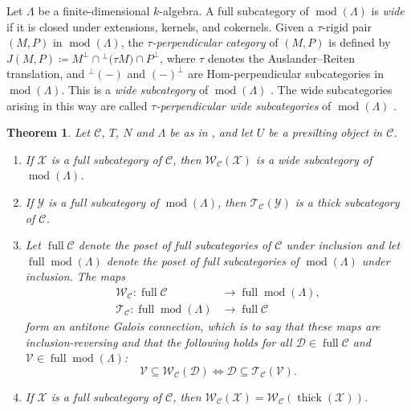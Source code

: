 \documentclass[10pt,twoside, a4paper,reqno]{amsart}
\DeclareMathOperator{\mods}{mod}
\DeclareMathOperator{\thick}{thick}
\DeclareMathOperator{\fullsubc}{full}
\newcommand{\calC}{\mathcal{C}}
\newcommand{\calT}{\mathcal{T}}
\newcommand{\calW}{\mathcal{W}}
\newtheorem{theorem}{Theorem}[section]
\theoremstyle{definition}
\begin{document}
Let $\Lambda$ be a finite-dimensional $k$-algebra. A full subcategory of $\mods(\Lambda)$ is \textit{wide} if it is closed under extensions, kernels, and cokernels.
Given a $\tau$-rigid pair $(M,P)$ in $\mods(\Lambda)$, the \textit{$\tau$-perpendicular category} of $(M,P)$ is defined by $J(M,P)\coloneqq M^{\perp} \cap {^{\perp}(\tau M})\cap P^{\perp}$, where $\tau$ denotes the Auslander--Reiten translation, and ${^{\perp}(-)}$ and ${(-)^{\perp}}$ are Hom-perpendicular subcategories in $\mods(\Lambda)$. This is a \textit{wide subcategory} of $\mods(\Lambda)$ \cite[{Thm.} 4.12(a)]{DIRRT17}. {The} wide subcategories arising in this way are called \textit{$\tau$-perpendicular wide subcategories} of $\mods(\Lambda)$ \cite[{Def.} 3.2]{BH21}.

\begin{theorem}\label{prop:Monica}
    Let $\calC$, $T$, $N$ and $\Lambda$ be as in , and let $U$ be a presilting object in $\calC$.
    \begin{enumerate}
        \item\label{prop:Monica_W} If $\mathcal{X}$ is a full subcategory of $\calC$, then $\calW_{\calC}(\mathcal{X})$ is a wide subcategory of $\mods(\Lambda)$.
        \item\label{prop:Monica_T} If $\mathcal{Y}$ is a full subcategory of $\mods(\Lambda)$, then $\calT_{\calC}(\mathcal{Y})$ is a thick subcategory of $\calC$.
        \item\label{prop:Monica_Galois} Let $\fullsubc{\calC}$ denote the poset of full subcategories of $\calC$ {under inclusion} and {let} $\fullsubc \mods(\Lambda)$ denote the poset of full subcategories of $\mods(\Lambda)$ {under inclusion}. The maps 
    \begin{align*}
        \calW_{\calC}: \fullsubc {\calC} &\to \fullsubc \mods(\Lambda), \\
        \calT_{\calC}: \fullsubc \mods(\Lambda) &\to \fullsubc {\calC}
    \end{align*}
    form an antitone Galois connection, which is to say that these maps are inclusion-reversing and that the following holds for all $\mathcal{D}\in \fullsubc \calC$ and $\mathcal{V}\in \fullsubc \mods(\Lambda)$:
    \begin{equation}\label{eq:Monica_Galois}
       \mathcal{V}\subseteq \calW_{\calC}(\mathcal{D}) \Longleftrightarrow \mathcal{D}\subseteq \calT_{\calC}(\mathcal{V}).
    \end{equation}
    \item\label{prop:Monica_Wbis} If $\mathcal{X}$ is {a full subcategory of $\calC$}, then $\calW_{\calC}(\mathcal{X})=\calW_{\calC}(\thick(\mathcal{X}))$.

\end{enumerate}
\end{theorem}
\end{document}
